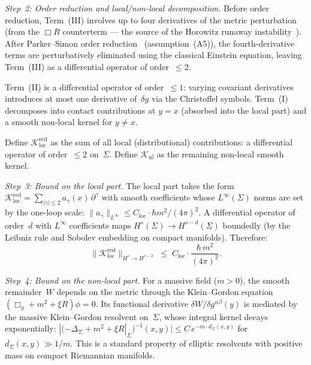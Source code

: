 \documentclass[12pt,a4paper]{article}
\begin{document}
\smallskip\noindent\textit{Step~2: Order reduction and local/non-local decomposition.}
Before order reduction, Term~(III) involves up to four derivatives of the
metric perturbation (from the $\Box R$ counterterm --- the source of the
Horowitz runaway instability~\cite{horowitz}). After Parker--Simon order
reduction~\cite{parker_simon} (assumption~(A5)), the fourth-derivative
terms are perturbatively eliminated using the classical Einstein equation,
leaving Term~(III) as a differential operator of order~$\leq 2$.

Term~(II) is a differential operator of order~$\leq 1$: varying
covariant derivatives introduces at most one derivative of~$\delta g$
via the Christoffel symbols. Term~(I) decomposes into contact
contributions at $y = x$ (absorbed into the local part) and a smooth
non-local kernel for $y\neq x$.

Define $\mathcal{K}^{\mathrm{red}}_{\mathrm{loc}}$ as the sum of all
local (distributional) contributions: a differential operator of
order~$\leq 2$ on~$\Sigma$. Define $\mathcal{K}_{\mathrm{nl}}$ as the
remaining non-local smooth kernel.

\smallskip\noindent\textit{Step~3: Bound on the local part.}
The local part takes the form
$\mathcal{K}^{\mathrm{red}}_{\mathrm{loc}}
= \sum_{|\gamma|\leq 2}a_\gamma(x)\,\partial^\gamma$
with smooth coefficients whose $L^\infty(\Sigma)$ norms are set by the
one-loop scale: $\|a_\gamma\|_{L^\infty} \leq C_{\mathrm{loc}}
\cdot\hbar m^2/(4\pi)^2$. A differential operator of order~$d$ with
$L^\infty$ coefficients maps $H^s(\Sigma)\to H^{s-d}(\Sigma)$
boundedly (by the Leibniz rule and Sobolev embedding on compact
manifolds). Therefore:
\begin{equation}
\bigl\|\mathcal{K}^{\mathrm{red}}_{\mathrm{loc}}\bigr\|_{H^s\to H^{s-2}}
\;\leq\; C_{\mathrm{loc}}\cdot\frac{\hbar\,m^2}{(4\pi)^2}.
\label{eq:loc_bound}
\end{equation}

\smallskip\noindent\textit{Step~4: Bound on the non-local part.}
For a massive field ($m > 0$), the smooth remainder~$W$ depends on the
metric through the Klein--Gordon equation
$(\Box_g + m^2 + \xi R)\phi = 0$. Its functional derivative
$\delta W/\delta g^{\alpha\beta}(y)$ is mediated by the massive
Klein--Gordon resolvent on~$\Sigma$, whose integral kernel decays
exponentially: $|(-\Delta_\Sigma + m^2 + \xi R|_\Sigma)^{-1}(x,y)|
\leq C\,e^{-m\cdot d_\Sigma(x,y)}$ for $d_\Sigma(x,y) \gg 1/m$. This
is a standard property of elliptic resolvents with positive mass on
compact Riemannian manifolds.
\end{document}
